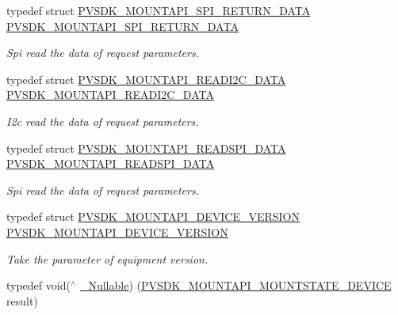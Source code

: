 \begin{DoxyCompactItemize}
typedef struct \hyperlink{struct_p_v_s_d_k___m_o_u_n_t_a_p_i___s_p_i___r_e_t_u_r_n___d_a_t_a}{P\+V\+S\+D\+K\+\_\+\+M\+O\+U\+N\+T\+A\+P\+I\+\_\+\+S\+P\+I\+\_\+\+R\+E\+T\+U\+R\+N\+\_\+\+D\+A\+TA} \hyperlink{group___p_v_s_d_k___c_o_r_e___a_p_i___m_o_u_n_t_c_o_n_t_r_o_l_gaf8bfda9eb61079f8c1cd421fb2040dd4}{P\+V\+S\+D\+K\+\_\+\+M\+O\+U\+N\+T\+A\+P\+I\+\_\+\+S\+P\+I\+\_\+\+R\+E\+T\+U\+R\+N\+\_\+\+D\+A\+TA}
\begin{DoxyCompactList}\small\item\em Spi read the data of request parameters. \end{DoxyCompactList}\item 
typedef struct \hyperlink{struct_p_v_s_d_k___m_o_u_n_t_a_p_i___r_e_a_d_i2_c___d_a_t_a}{P\+V\+S\+D\+K\+\_\+\+M\+O\+U\+N\+T\+A\+P\+I\+\_\+\+R\+E\+A\+D\+I2\+C\+\_\+\+D\+A\+TA} \hyperlink{group___p_v_s_d_k___c_o_r_e___a_p_i___m_o_u_n_t_c_o_n_t_r_o_l_gafeca2cac667d3a3c8cab109a4fccc931}{P\+V\+S\+D\+K\+\_\+\+M\+O\+U\+N\+T\+A\+P\+I\+\_\+\+R\+E\+A\+D\+I2\+C\+\_\+\+D\+A\+TA}
\begin{DoxyCompactList}\small\item\em I2c read the data of request parameters. \end{DoxyCompactList}\item 
typedef struct \hyperlink{struct_p_v_s_d_k___m_o_u_n_t_a_p_i___r_e_a_d_s_p_i___d_a_t_a}{P\+V\+S\+D\+K\+\_\+\+M\+O\+U\+N\+T\+A\+P\+I\+\_\+\+R\+E\+A\+D\+S\+P\+I\+\_\+\+D\+A\+TA} \hyperlink{group___p_v_s_d_k___c_o_r_e___a_p_i___m_o_u_n_t_c_o_n_t_r_o_l_ga210541322c1bfb28d6e006a0baf8a99d}{P\+V\+S\+D\+K\+\_\+\+M\+O\+U\+N\+T\+A\+P\+I\+\_\+\+R\+E\+A\+D\+S\+P\+I\+\_\+\+D\+A\+TA}
\begin{DoxyCompactList}\small\item\em Spi read the data of request parameters. \end{DoxyCompactList}\item 
typedef struct \hyperlink{struct_p_v_s_d_k___m_o_u_n_t_a_p_i___d_e_v_i_c_e___v_e_r_s_i_o_n}{P\+V\+S\+D\+K\+\_\+\+M\+O\+U\+N\+T\+A\+P\+I\+\_\+\+D\+E\+V\+I\+C\+E\+\_\+\+V\+E\+R\+S\+I\+ON} \hyperlink{group___p_v_s_d_k___c_o_r_e___a_p_i___m_o_u_n_t_c_o_n_t_r_o_l_gab94f9a6517245771dfa4cb61bd6c7abb}{P\+V\+S\+D\+K\+\_\+\+M\+O\+U\+N\+T\+A\+P\+I\+\_\+\+D\+E\+V\+I\+C\+E\+\_\+\+V\+E\+R\+S\+I\+ON}
\begin{DoxyCompactList}\small\item\em Take the parameter of equipment version. \end{DoxyCompactList}\item 
typedef void($^\wedge$ \hyperlink{group___p_v_s_d_k___c_o_r_e___a_p_i___m_o_u_n_t_c_o_n_t_r_o_l_ga5a1de33b230662127568783314b4a54d}{\+\_\+\+Nullable}) (\hyperlink{struct_p_v_s_d_k___m_o_u_n_t_a_p_i___m_o_u_n_t_s_t_a_t_e___d_e_v_i_c_e}{P\+V\+S\+D\+K\+\_\+\+M\+O\+U\+N\+T\+A\+P\+I\+\_\+\+M\+O\+U\+N\+T\+S\+T\+A\+T\+E\+\_\+\+D\+E\+V\+I\+CE} result)
\end{DoxyCompactItemize}
